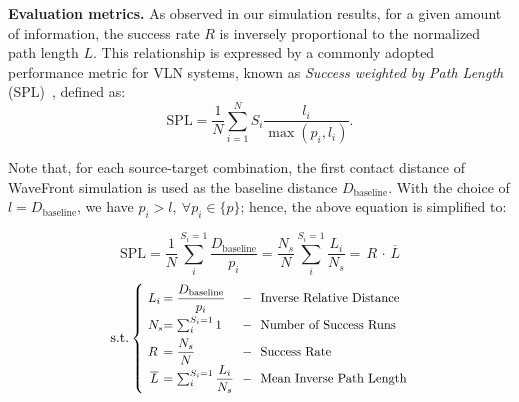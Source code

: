 




\newcommand{\EP}{\bm{\varepsilon}}


\vspace{1mm}
\noindent
\textbf{Evaluation metrics.} As observed in our simulation results, for a given amount of information, the success rate $R$ is inversely proportional to the normalized path length $L$. This relationship is expressed by a commonly adopted performance metric for VLN systems, known as \textit{Success weighted by Path Length} (SPL)~\cite{anderson2018evaluation}, defined as:
\begin{equation}
\text{SPL} = \frac{1}{N} \sum_{i=1}^N S_i \frac{l_i}{\max(p_i, l_i)}.
\label{eq:SPL}
\end{equation}

\noindent
Note that, for each source-target combination, the first contact distance of WaveFront simulation is used as the baseline distance $D_\text{baseline}$. With the choice of $l = D_\text{baseline}$, we have $p_i > l, ~ \forall p_i \in \{p\}$; hence, the above equation is simplified to:

\begin{equation}
\text{SPL}
  = \frac{1}{N} \sum_{i}^{S_i = 1} \frac{D_\text{baseline}}{p_i}
  = \frac{N_s}{N} \sum_{i}^{S_i = 1} \frac{L_i}{N_s}
  = \,R\, \cdot \,\overline{L}
\end{equation}
\begin{equation}
\text{s.t.}
\left\{\scalebox{.9}{$
    \setlength\arraycolsep{0pt}
    \begin{matrix*}[l]
        \,\,L_i & = \dfrac{D_\text{baseline}}{p_i}
        & ~ ~ - ~ ~ \text{Inverse Relative Distance} \\[8pt]
        \,\,N_s & = \sum_{i}^{S_i = 1} 1
        & ~ ~ - ~ ~ \text{Number of Success Runs} \\[4pt]
        ~ R & = \dfrac{N_s}{N}
        & ~ ~ - ~ ~ \text{Success Rate} \\[4pt]
        ~\, \overline{L} & = \sum_{i}^{S_i = 1} \dfrac{L_i}{N_s}
        & ~ ~ - ~ ~ \text{Mean Inverse Path Length} \\[4pt]
    \end{matrix*}
$}\right.
\label{eq:definitions}
\end{equation}

